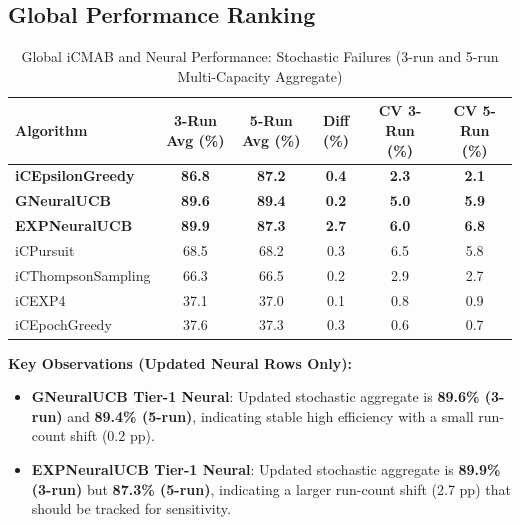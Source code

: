 \documentclass[12pt,a4paper]{article}
\newcommand{\primarytext}[1]{\textcolor{primaryblue}{\textbf{#1}}}
\newcommand{\legacy}[1]{\textcolor{legacycolor}{\textbf{#1}}}
\newcommand{\neural}[1]{\textcolor{neuralcolor}{\textbf{#1}}}
\begin{document}
\begin{tcolorbox}[colback=tableheader,colframe=primaryblue,title=\textbf{Primary iCMAB Performance Results (Stochastic Environment, Attack Rate: 0.25)}]

\subsection{Global Performance Ranking}

\begin{table}[H]
\small
\centering
\caption{Global iCMAB and Neural Performance: Stochastic Failures (3-run and 5-run Multi-Capacity Aggregate)}
\label{tab:global-performance-stochastic}
\begin{tabular}{@{}lccccc@{}}
\toprule
\textbf{Algorithm} & \textbf{3-Run Avg (\%)} & \textbf{5-Run Avg (\%)} & \textbf{Diff (\%)} & \textbf{CV 3-Run (\%)} & \textbf{CV 5-Run (\%)} \\
\midrule
\primarytext{iCEpsilonGreedy}   & \primarytext{86.8} & \primarytext{87.2} & \primarytext{0.4} & \primarytext{2.3} & \primarytext{2.1} \\
\neural{GNeuralUCB}            & \neural{89.6} & \neural{89.4} & \neural{0.2} & \neural{5.0} & \neural{5.9} \\
\legacy{EXPNeuralUCB}           & \legacy{89.9} & \legacy{87.3} & \legacy{2.7} & \legacy{6.0} & \legacy{6.8} \\
iCPursuit                       & 68.5 & 68.2 & 0.3 & 6.5 & 5.8 \\
iCThompsonSampling              & 66.3 & 66.5 & 0.2 & 2.9 & 2.7 \\
iCEXP4                          & 37.1 & 37.0 & 0.1 & 0.8 & 0.9 \\
iCEpochGreedy                   & 37.6 & 37.3 & 0.3 & 0.6 & 0.7 \\
\bottomrule
\end{tabular}
\end{table}

\textbf{Key Observations (Updated Neural Rows Only):}
\begin{itemize}
\item \neural{GNeuralUCB Tier-1 Neural}: Updated stochastic aggregate is \neural{89.6\% (3-run)} and \neural{89.4\% (5-run)}, indicating stable high efficiency with a small run-count shift (0.2 pp).
\item \legacy{EXPNeuralUCB Tier-1 Neural}: Updated stochastic aggregate is \legacy{89.9\% (3-run)} but \legacy{87.3\% (5-run)}, indicating a larger run-count shift (2.7 pp) that should be tracked for sensitivity.
\end{itemize}
\end{tcolorbox}
\end{document}

